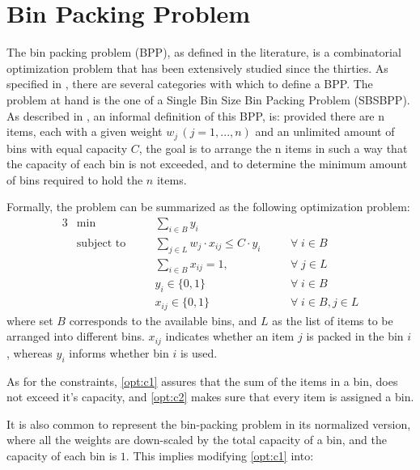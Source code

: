 \chapter{Bin Packing Problem} \label{chap:literature review}

The bin packing problem (BPP), as defined in the literature, is a combinatorial
optimization problem that has been extensively studied since the thirties. As
specified in \cite{wascher2007improved}, there are several categories with which
to define a BPP. The problem at hand is the one of a Single Bin Size Bin Packing
Problem (SBSBPP). As described in \cite{delorme2016bin}, an informal definition
of this BPP, is: provided there are n items, each with a given weight \( w_j  \,
(j = 1, ..., n) \) and an unlimited amount of bins with equal capacity \( C \),
the goal is to arrange the n items in such a way that the capacity of each bin
is not exceeded, and to determine the minimum amount of bins required to hold
the $n$ items.

Formally, the problem can be summarized as the following optimization problem:
\begin{alignat}{3}
    &\min       
        &&\sum_{i \in B} y_i 
            && \\
    &\text{subject to} \quad
        && \sum_{j \in L} w_j \cdot x_{ij} \leq C \cdot y_i \quad      
            && \forall \; i \in B \label{opt:c1} \\
    &   && \sum_{i \in B} x_{ij} = 1, \quad                 
            && \forall \; j \in L \label{opt:c2} \\
    &   && y_i \in \{0, 1\}                                 
            && \forall \; i \in B \\
    &   && x_{ij} \in \{0,1\}                               
            && \forall \; i \in B, j \in L
\end{alignat}
where set $B$ corresponds to the available bins, and $L$ as the list of items to
be arranged into different bins. $x_{ij}$ indicates whether an item $j$ is
packed in the bin $i$, whereas $y_i$ informs whether bin $i$ is used. 

As for the constraints, \ref{opt:c1} assures that the sum of the items in a bin,
does not exceed it's capacity, and \ref{opt:c2} makes sure that every item is
assigned a bin. 

It is also common to represent the bin-packing problem in its normalized
version, where all the weights are down-scaled by the total capacity of a bin,
and the capacity of each bin is $1$. This implies modifying \ref{opt:c1} into:

